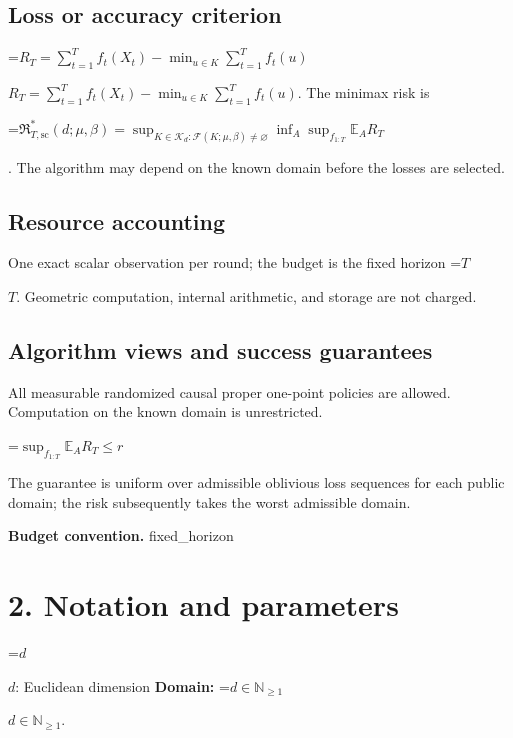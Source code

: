 \documentclass[10pt,a4paper]{article}
\newcommand{\AtlasMath}[1]{\par\begingroup\centering\setbox0=\hbox{$\displaystyle #1$}\ifdim\wd0>1.4\linewidth\typeout{ATLAS WIDE FORMULA: \the\wd0}\fi\ifdim\wd0>\linewidth\resizebox{\linewidth}{!}{\box0}\else\box0\fi\par\endgroup}
\newcommand{\AtlasInlineMath}[1]{\begingroup\setbox0=\hbox{$#1$}\ifdim\wd0>.4\linewidth\endgroup\AtlasMath{#1}\else\endgroup$#1$\fi}
\begin{document}
\subsection{Loss or accuracy criterion}


\AtlasInlineMath{R_T=\sum_{t=1}^T f_t(X_t)-\min_{u\in K}\sum_{t=1}^T f_t(u)}. The minimax risk is
\AtlasMath{\mathfrak R^*_{T,\mathrm{sc}}(d;\mu,\beta)=\sup_{K\in\mathcal K_d:\mathcal F(K;\mu,\beta)\ne\varnothing}\inf_A\sup_{f_{1:T}}\mathbb E_A R_T}
. The algorithm may depend on the known domain before the losses are selected.



\subsection{Resource accounting}


One exact scalar observation per round; the budget is the fixed horizon \AtlasInlineMath{T}. Geometric computation, internal arithmetic, and storage are not charged.



\subsection{Algorithm views and success guarantees}


All measurable randomized causal proper one-point policies are allowed. Computation on the known domain is unrestricted.




\AtlasMath{\sup_{f_{1:T}}\mathbb E_A R_T\le r}




The guarantee is uniform over admissible oblivious loss sequences for each public domain; the risk subsequently takes the worst admissible domain.



\textbf{Budget convention.} fixed\_horizon



\section{2. Notation and parameters}


\AtlasInlineMath{d}: Euclidean dimension \textbf{Domain:} \AtlasInlineMath{d\in\mathbb N_{\ge1}}.
\end{document}
